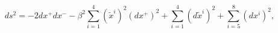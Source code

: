 \begin{equation}
\label{metppintD3}
ds^2 = - 2 dx^+ dx^- - \beta^2 \sum_{i=1}^4 (\tilde{x}^i)^2 (dx^+)^2
+ \sum_{i=1}^4 (d\tilde{x}^i)^2
+ \sum_{i=5}^8 (dx^i)^2,
\end{equation}

